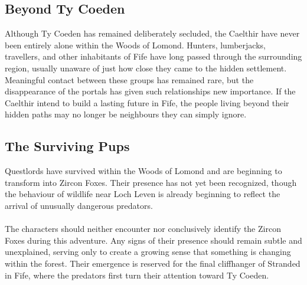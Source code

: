 \subsection*{Beyond Ty Coeden}
{\entryfont Although Ty Coeden has remained deliberately secluded, the Caelthir have never been entirely alone within the Woods of Lomond. Hunters, lumberjacks, travellers, and other inhabitants of Fife have long passed through the surrounding region, usually unaware of just how close they came to the hidden settlement. Meaningful contact between these groups has remained rare, but the disappearance of the portals has given such relationships new importance. If the Caelthir intend to build a lasting future in Fife, the people living beyond their hidden paths may no longer be neighbours they can simply ignore.}
\subsection*{The Surviving Pups}
{\entryfont Questlords have survived within the Woods of Lomond and are beginning to transform into Zircon Foxes. Their presence has not yet been recognized, though the behaviour of wildlife near Loch Leven is already beginning to reflect the arrival of unusually dangerous predators.\\\\
The characters should neither encounter nor conclusively identify the Zircon Foxes during this adventure. Any signs of their presence should remain subtle and unexplained, serving only to create a growing sense that something is changing within the forest. Their emergence is reserved for the final cliffhanger of Stranded in Fife, where the predators first turn their attention toward Ty Coeden.}